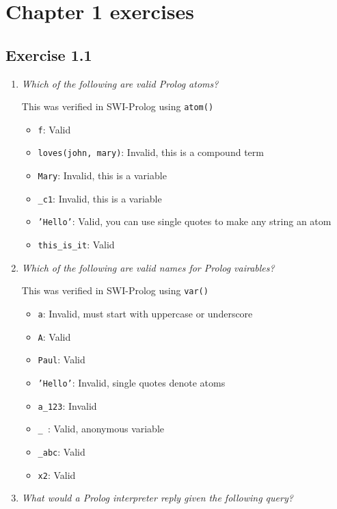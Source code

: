 \documentclass{report}
\newcommand{\code}[1]{\texttt{#1}}
\begin{document}
\chapter{Chapter 1 exercises}
\section{\textbf{Exercise 1.1}}
\begin{enumerate}[label=(\alph*)]
    \item \emph{Which of the following are valid Prolog atoms?}
    
    This was verified in SWI-Prolog using \code{atom()}
    \begin{itemize}[label={}]
        \item \code{f}: Valid 
        \item \code{loves(john, mary)}: Invalid, this is a compound term
        \item \code{Mary}: Invalid, this is a variable
        \item \code{\_c1}: Invalid, this is a variable
        \item \code{'Hello'}: Valid, you can use single quotes to make any string an atom
        \item \code{this\_is\_it}: Valid
    \end{itemize}

    \item \emph{Which of the following are valid names for Prolog vairables?}
    
    This was verified in SWI-Prolog using \code{var()}
    \begin{itemize}[label={}]
        \item \code{a}: Invalid, must start with uppercase or underscore
        \item \code{A}: Valid
        \item \code{Paul}: Valid
        \item \code{'Hello'}: Invalid, single quotes denote atoms
        \item \code{a\_123}: Invalid
        \item \code{\_ }: Valid, anonymous variable
        \item \code{\_abc}: Valid
        \item \code{x2}: Valid
    \end{itemize}

    \item \emph{What would a Prolog interpreter reply given the following query?}


\end{enumerate}
\end{document}
